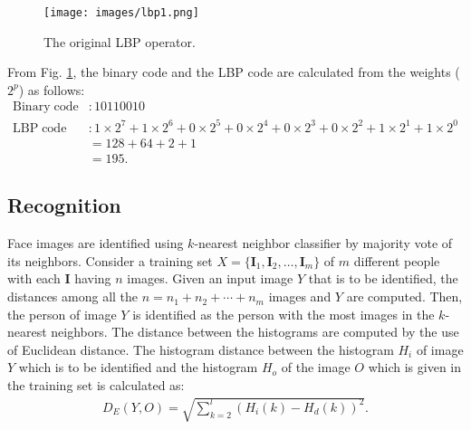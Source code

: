 \begin{figure}[!h]
\centering 
\texttt{[image: images/lbp1.png]}
\caption{The original LBP operator.}
\label{lbp} 
\end{figure}
From Fig. \ref{lbp}, the binary code and the LBP code are calculated from the weights ($2^p$) as follows:
\begin{align*}
\mathrm{Binary \; code}&: 10110010\\
\mathrm{LBP \; code} &: 1\times 2^7+ 1\times 2^6 + 0\times 2^5+ 0\times 2^4 + 0\times 2^3 + 0\times 2^2 + 1\times 2^1+ 1\times 2^0\\
& = 128 + 64 + 2 + 1\\
& = 195.
\end{align*}

\subsection{Recognition}
Face images are identified using $k$-nearest neighbor classifier by majority vote of its neighbors. Consider a training set $X =\lbrace \mathbf{I}_1, \mathbf{I}_2, \ldots, \mathbf{I}_m\rbrace$ of $m$ different people with each $\mathbf{I}$ having $n$ images. Given an input image $Y$ that is to be identified, the distances among all the $n = n_1 +n_2+ \cdots + n_m$ images and $Y$ are computed. Then, the person of image $Y$ is identified as the person with the most images in the $k$-nearest neighbors. The distance between the histograms are computed by the use of Euclidean distance. The histogram distance between the histogram $H_i$ of image $Y$ which is to be identified and the histogram $H_o$ of the image $O$ which is given in the  training set is calculated as: \begin{align*}
D_E (Y, O) = \sqrt{\sum_{k=2}^{l}(H_i(k)-H_d(k))^2}.
\end{align*}














